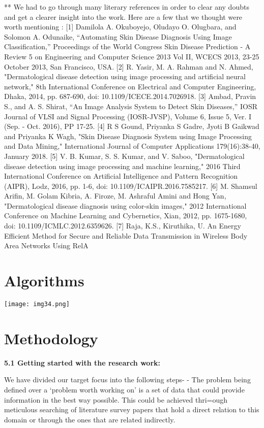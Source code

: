 \documentclass{article}
\begin{document}
** We had to go through many literary references in order to clear any doubts and get a clearer insight into the work. Here are a few that we thought were worth mentioning :
[1] Damilola A. Okuboyejo, Oludayo O. Olugbara, and Solomon A. Odunaike, “Automating Skin Disease Diagnosis Using Image Classification,” Proceedings of the World Congress
Skin Disease Prediction - A Review 5
on Engineering and Computer Science 2013 Vol II, WCECS 2013, 23-25 October 2013,
San Francisco, USA.
[2] R. Yasir, M. A. Rahman and N. Ahmed, "Dermatological disease detection using image
processing and artificial neural network," 8th International Conference on Electrical and
Computer Engineering, Dhaka, 2014, pp. 687-690, doi: 10.1109/ICECE.2014.7026918. [3] Ambad, Pravin S., and A. S. Shirat, “An Image Analysis System to Detect Skin Diseases,”
IOSR Journal of VLSI and Signal Processing (IOSR-JVSP), Volume 6, Issue 5, Ver. I
(Sep. - Oct. 2016), PP 17-25.
[4] R S Gound, Priyanka S Gadre, Jyoti B Gaikwad and Priyanka K Wagh, "Skin Disease
Diagnosis System using Image Processing and Data Mining," International Journal of
Computer Applications 179(16):38-40, January 2018.
[5] V. B. Kumar, S. S. Kumar, and V. Saboo, "Dermatological disease detection using image
processing and machine learning," 2016 Third International Conference on Artificial Intelligence and Pattern Recognition (AIPR), Lodz, 2016, pp. 1-6, doi: 10.1109/ICAIPR.2016.7585217.
[6] M. Shamsul Arifin, M. Golam Kibria, A. Firoze, M. Ashraful Amini and Hong Yan, "Dermatological disease diagnosis using color-skin images," 2012 International Conference on Machine Learning and Cybernetics, Xian, 2012, pp. 1675-1680, doi: 10.1109/ICMLC.2012.6359626.
[7] Raja, K.S., Kiruthika, U. An Energy Efficient Method for Secure and Reliable Data Transmission in Wireless Body Area Networks Using RelA

\section{Algorithms}
\begin{center}
    \texttt{[image: img34.png]}
\end{center}
\section{Methodology}

\textbf{5.1 Getting started with the research work:}

We have divided our target focus into the following steps-
- The problem being defined over a ‘problem worth working on’ is a set of data that could provide information in the best way possible. This could be achieved thri=ough meticulous searching of literature survey papers that hold a direct relation to this domain or through the ones that are related indirectly.
\end{document}

